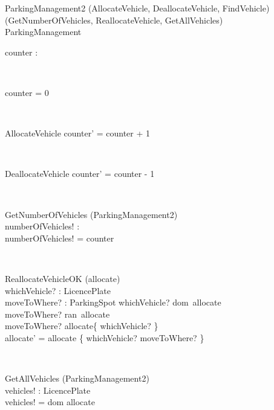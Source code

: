 \documentclass[12pt]{article}
\begin{document}
\begin{spacing}{1.5}
\begin{class}{ParkingManagement2}
\also
\upharpoonright (AllocateVehicle, DeallocateVehicle, FindVehicle) \\
\upharpoonright (GetNumberOfVehicles, ReallocateVehicle, GetAllVehicles) \\
ParkingManagement\\
\begin{state}
counter : \\
\where
\end{state} \\
\begin{init}
counter = 0\\
\end{init} \\
\begin{op}{AllocateVehicle}
\ST
counter' = counter + 1 \\
\end{op}\\
\begin{op}{DeallocateVehicle}
\ST
counter' = counter - 1 \\
\end{op}\\
\begin{op}{GetNumberOfVehicles}
\Xi (ParkingManagement2)\\
numberOfVehicles! : \\
\ST
numberOfVehicles! = counter\\
\end{op}\\
\begin{op}{ReallocateVehicleOK}
\Delta (allocate) \\
whichVehicle? : LicencePlate\\
moveToWhere? : ParkingSpot
\ST
whichVehicle? \in dom~allocate\\
moveToWhere? \notin ran~allocate\\
moveToWhere? \neq allocate\{ whichVehicle? \} \\
allocate' = allocate \oplus \{ whichVehicle? \mapsto moveToWhere? \}
\end{op}\\
\begin{op}{GetAllVehicles}
\Xi (ParkingManagement2)\\
vehicles! : LicencePlate\\
\ST
vehicles! = dom \: allocate\\
\end{op}\\
\end{class}


\end{spacing}
\end{document}
